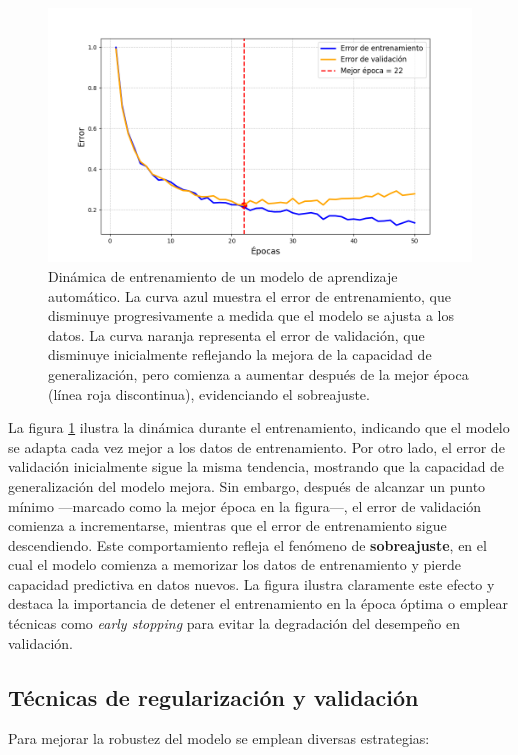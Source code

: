 \begin{figure}[H]
    \centering
    \includegraphics[scale=0.6]{figuras/dinamicatv.png}
    \caption{Dinámica de entrenamiento de un modelo de aprendizaje automático. La curva azul muestra el error de entrenamiento, que disminuye progresivamente a medida que el modelo se ajusta a los datos. La curva naranja representa el error de validación, que disminuye inicialmente reflejando la mejora de la capacidad de generalización, pero comienza a aumentar después de la mejor época (línea roja discontinua), evidenciando el sobreajuste.}
    \label{fig:dinamica}
\end{figure}


La figura \ref{fig:dinamica} ilustra la dinámica durante el entrenamiento, indicando que el modelo se adapta cada vez mejor a los datos de entrenamiento. Por otro lado, el error de validación inicialmente sigue la misma tendencia, mostrando que la capacidad de generalización del modelo mejora. Sin embargo, después de alcanzar un punto mínimo —marcado como la mejor época en la figura—, el error de validación comienza a incrementarse, mientras que el error de entrenamiento sigue descendiendo. Este comportamiento refleja el fenómeno de \textbf{sobreajuste}, en el cual el modelo comienza a memorizar los datos de entrenamiento y pierde capacidad predictiva en datos nuevos. La figura ilustra claramente este efecto y destaca la importancia de detener el entrenamiento en la época óptima o emplear técnicas como \textit{early stopping} para evitar la degradación del desempeño en validación.


\subsection*{Técnicas de regularización y validación}
Para mejorar la robustez del modelo se emplean diversas estrategias:

